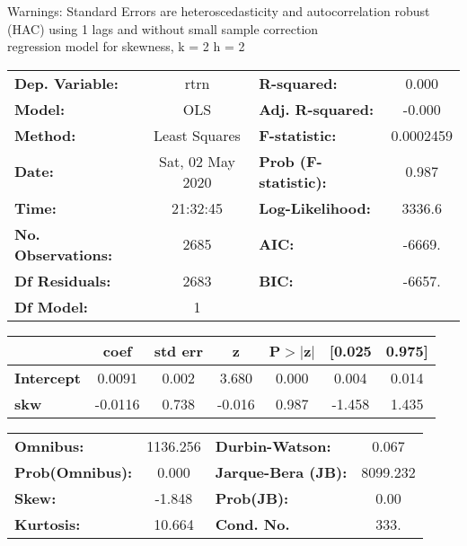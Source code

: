 Warnings: \newline
 [1] Standard Errors are heteroscedasticity and autocorrelation robust (HAC) using 1 lags and without small sample correction\\ 

regression model for skewness, k = 2 h = 2\begin{center}
\begin{tabular}{lclc}
\toprule
\textbf{Dep. Variable:}    &       rtrn       & \textbf{  R-squared:         } &     0.000   \\
\textbf{Model:}            &       OLS        & \textbf{  Adj. R-squared:    } &    -0.000   \\
\textbf{Method:}           &  Least Squares   & \textbf{  F-statistic:       } & 0.0002459   \\
\textbf{Date:}             & Sat, 02 May 2020 & \textbf{  Prob (F-statistic):} &    0.987    \\
\textbf{Time:}             &     21:32:45     & \textbf{  Log-Likelihood:    } &    3336.6   \\
\textbf{No. Observations:} &        2685      & \textbf{  AIC:               } &    -6669.   \\
\textbf{Df Residuals:}     &        2683      & \textbf{  BIC:               } &    -6657.   \\
\textbf{Df Model:}         &           1      & \textbf{                     } &             \\
\bottomrule
\end{tabular}
\begin{tabular}{lcccccc}
                   & \textbf{coef} & \textbf{std err} & \textbf{z} & \textbf{P$> |$z$|$} & \textbf{[0.025} & \textbf{0.975]}  \\
\midrule
\textbf{Intercept} &       0.0091  &        0.002     &     3.680  &         0.000        &        0.004    &        0.014     \\
\textbf{skw}       &      -0.0116  &        0.738     &    -0.016  &         0.987        &       -1.458    &        1.435     \\
\bottomrule
\end{tabular}
\begin{tabular}{lclc}
\textbf{Omnibus:}       & 1136.256 & \textbf{  Durbin-Watson:     } &    0.067  \\
\textbf{Prob(Omnibus):} &   0.000  & \textbf{  Jarque-Bera (JB):  } & 8099.232  \\
\textbf{Skew:}          &  -1.848  & \textbf{  Prob(JB):          } &     0.00  \\
\textbf{Kurtosis:}      &  10.664  & \textbf{  Cond. No.          } &     333.  \\
\bottomrule
\end{tabular}
\end{center}

